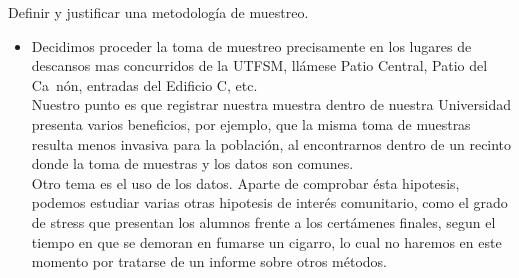 Definir y justificar una metodolog\'ia de muestreo.
	\begin{itemize}
		\item Decidimos proceder la toma de muestreo precisamente en los lugares de descansos mas concurridos de la UTFSM, ll\'amese Patio Central, Patio del Ca~n\'on, entradas del Edificio C, etc. \\
		Nuestro punto es que registrar nuestra muestra dentro de nuestra Universidad presenta varios beneficios, por ejemplo, que la misma toma de muestras resulta menos invasiva para la poblaci\'on, al encontrarnos dentro de un recinto donde la toma de muestras y los datos son comunes. \\
		Otro tema es el uso de los datos. Aparte de comprobar \'esta hipotesis, podemos estudiar varias otras hipotesis de inter\'es comunitario, como el grado de stress que presentan los alumnos frente a los cert\'amenes finales, segun el tiempo en que se demoran en fumarse un cigarro, lo cual no haremos en este momento por tratarse de un informe sobre otros m\'etodos.
	\end{itemize}
